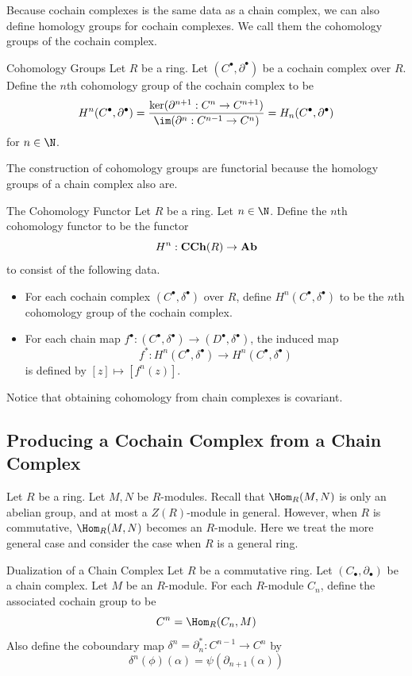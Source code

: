 \documentclass[a4paper]{article}
\begin{document}
Because cochain complexes is the same data as a chain complex, we can also define homology groups for cochain complexes. We call them the cohomology groups of the cochain complex. 

\begin{defn}{Cohomology Groups}{} Let $R$ be a ring. Let $(C^\bullet,\partial^\bullet)$ be a cochain complex over $R$. Define the $n$th cohomology group of the cochain complex to be $$H^n(C^\bullet,\partial^\bullet)=\frac{\ker(\partial^{n+1}:C^n\to C^{n+1})}{\im(\partial^n:C^{n-1}\to C^n)}=H_n(C^\bullet,\partial^\bullet)$$ for $n\in\N$. 
\end{defn}

The construction of cohomology groups are functorial because the homology groups of a chain complex also are. 

\begin{defn}{The Cohomology Functor}{} Let $R$ be a ring. Let $n\in\N$. Define the $n$th cohomology functor to be the functor $$H^n:\bold{CCh}(R)\to\bold{Ab}$$ to consist of the following data. 
\begin{itemize}
\item For each cochain complex $(C^\bullet,\delta^\bullet)$ over $R$, define $H^n(C^\bullet,\delta^\bullet)$ to be the $n$th cohomology group of the cochain complex. 
\item For each chain map $f^\bullet:(C^\bullet,\delta^\bullet)\to(D^\bullet,\delta^\bullet)$, the induced map $$f^\ast:H^n(C^\bullet,\delta^\bullet)\to H^n(C^\bullet,\delta^\bullet)$$ is defined by $[z]\mapsto[f^n(z)]$. 
\end{itemize}
\end{defn}

Notice that obtaining cohomology from chain complexes is covariant. 

\subsection{Producing a Cochain Complex from a Chain Complex}
Let $R$ be a ring. Let $M,N$ be $R$-modules. Recall that $\Hom_R(M,N)$ is only an abelian group, and at most a $Z(R)$-module in general. However, when $R$ is commutative, $\Hom_R(M,N)$ becomes an $R$-module. Here we treat the more general case and consider the case when $R$ is a general ring. 

\begin{defn}{Dualization of a Chain Complex}{} Let $R$ be a commutative ring. Let $(C_\bullet,\partial_\bullet)$ be a chain complex. Let $M$ be an $R$-module. For each $R$-module $C_n$, define the associated cochain group to be $$C^n=\Hom_R(C_n,M)$$ Also define the coboundary map $\delta^n=\partial_n^\ast:C^{n-1}\to C^n$ by $$\delta^n(\phi)(\alpha)=\psi(\partial_{n+1}(\alpha))$$
\end{defn}
\end{document}
